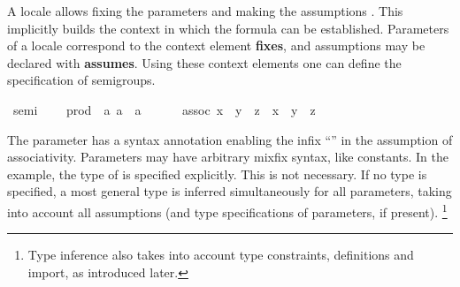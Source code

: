 \begin{isabellebody}
\begin{isamarkuptext}
  A locale allows fixing the parameters  and making the assumptions .  This implicitly builds the context in
  which the formula  can be established.
  Parameters of a locale correspond to the context element
  \textbf{fixes}, and assumptions may be declared with
  \textbf{assumes}.  Using these context elements one can define
  the specification of semigroups.%
\end{isamarkuptext}%
\isamarkupfalse%
\ semi\ {\isacharequal}\isanewline
\ \ \ prod\ {\isacharcolon}{\isacharcolon}\ {\isachardoublequote}{\isacharbrackleft}{\isacharprime}a{\isacharcomma}\ {\isacharprime}a{\isacharbrackright}\ {\isasymRightarrow}\ {\isacharprime}a{\isachardoublequote}\ {\isacharparenleft}\ {\isachardoublequote}{\isasymcdot}{\isachardoublequote}\ {}{}{\isacharparenright}\isanewline
\ \ \ assoc{\isacharcolon}\ {\isachardoublequote}{\isacharparenleft}x\ {\isasymcdot}\ y{\isacharparenright}\ {\isasymcdot}\ z\ {\isacharequal}\ x\ {\isasymcdot}\ {\isacharparenleft}y\ {\isasymcdot}\ z{\isacharparenright}{\isachardoublequote}\isamarkuptrue%
%
\begin{isamarkuptext}%
The parameter  has a
  syntax annotation enabling the infix ``\isa{{\isasymcdot}}'' in the
  assumption of associativity.  Parameters may have arbitrary mixfix
  syntax, like constants.  In the example, the type of  is
  specified explicitly.  This is not necessary.  If no type is
  specified, a most general type is inferred simultaneously for all
  parameters, taking into account all assumptions (and type
  specifications of parameters, if present).%
\footnote{Type inference also takes into account type constraints,
  definitions and import, as introduced later.}


\end{isamarkuptext}
\end{isabellebody}
